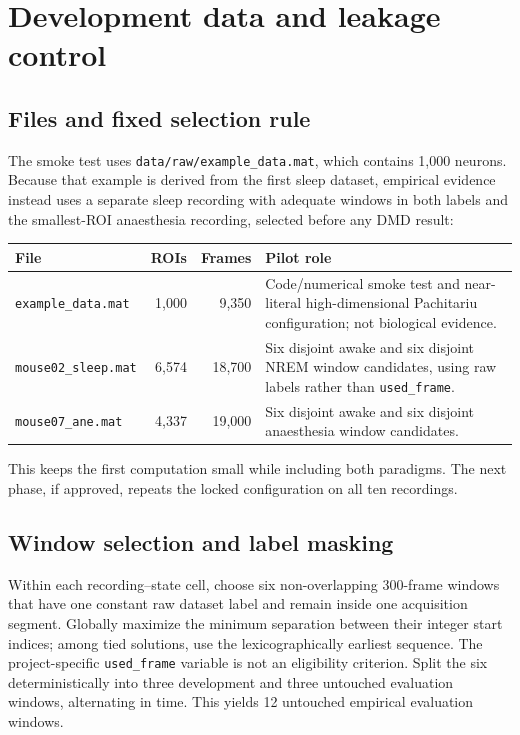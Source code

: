 \documentclass[11pt,a4paper]{article}
\begin{document}
\section{Development data and leakage control}

\subsection{Files and fixed selection rule}

The smoke test uses \texttt{data/raw/example\_data.mat}, which contains 1,000
neurons. Because that example is derived from the first sleep dataset, empirical
evidence instead uses a separate sleep recording with adequate windows in both
labels and the smallest-ROI anaesthesia recording, selected before any DMD result:

\begin{center}
\begin{tabularx}{\textwidth}{@{}lrrY@{}}
\toprule
File & ROIs & Frames & Pilot role\\
\midrule
\texttt{example\_data.mat} & 1,000 & 9,350 & Code/numerical smoke test and
near-literal high-dimensional Pachitariu configuration; not biological evidence.\\
\texttt{mouse02\_sleep.mat} & 6,574 & 18,700 & Six disjoint awake and six
disjoint NREM window candidates, using raw labels rather than
\texttt{used\_frame}.\\
\texttt{mouse07\_ane.mat} & 4,337 & 19,000 & Six disjoint awake and six
disjoint anaesthesia window candidates.\\
\bottomrule
\end{tabularx}
\end{center}

This keeps the first computation small while including both paradigms. The next
phase, if approved, repeats the locked configuration on all ten recordings.

\subsection{Window selection and label masking}

Within each recording--state cell, choose six non-overlapping 300-frame windows
that have one constant raw dataset label and remain inside one acquisition
segment. Globally maximize the minimum separation between their integer start
indices; among tied solutions, use the lexicographically earliest sequence. The project-specific
\texttt{used\_frame} variable is not an eligibility criterion. Split the six
deterministically into three development and three untouched evaluation windows,
alternating in time. This yields 12 untouched empirical evaluation windows.
\end{document}
